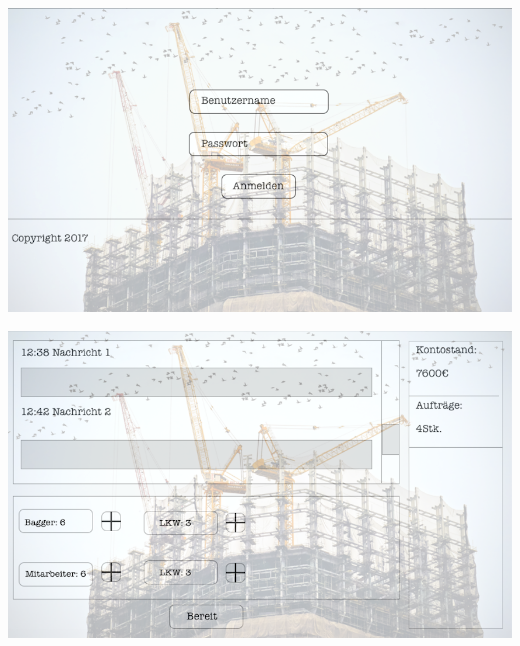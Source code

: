 \begin{minipage}{\linewidth}
	\centering 
	\includegraphics[scale=1]{img/Mockup1Teil1.png}
	\vspace{2em}
\end{minipage}


\begin{minipage}{\linewidth}
	\centering 
	\includegraphics[scale=1]{img/Mockup1Teil2.png}
	\vspace{2em}
\end{minipage}
